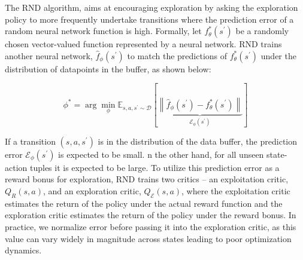\documentclass[12pt]{article}
\begin{document}
The RND algorithm, aims at encouraging exploration by asking the exploration policy to more frequently undertake transitions where the prediction error of a random neural network function is high. Formally, let $f_\theta^*\left(s^{\prime}\right)$ be a randomly chosen vector-valued function represented by a neural network. RND trains another neural network, $\hat{f}_\phi\left(s^{\prime}\right)$ to match the predictions of $f_\theta^*\left(s^{\prime}\right)$ under the distribution of datapoints in the buffer, as shown below:

\begin{equation}
    \phi^*=\arg \min _\phi \mathbb{E}_{s, a, s^{\prime} \sim \mathcal{D}}[\underbrace{\left\|\hat{f}_\phi\left(s^{\prime}\right)-f_\theta^*\left(s^{\prime}\right)\right\|}_{\mathcal{E}_\phi\left(s^{\prime}\right)}]
\end{equation}

If a transition $(s,a,s^\prime)$ is in the distribution of the data buffer, the prediction error $\mathcal{E}_\phi(s^\prime)$ is expected to be small. n the other hand, for all unseen state-action tuples it is expected to be large. To utilize this prediction error as a reward bonus for exploration, RND trains two critics – an exploitation critic, $Q_R(s,a)$, and an exploration critic, $Q_\mathcal{E} (s, a)$, where the exploitation critic estimates the return of the policy under the actual reward function and the exploration critic estimates the return of the policy under the reward bonus. In practice, we normalize error before passing it into the exploration critic, as this value can vary widely in magnitude across states leading to poor optimization dynamics.


\newpage
\end{document}
